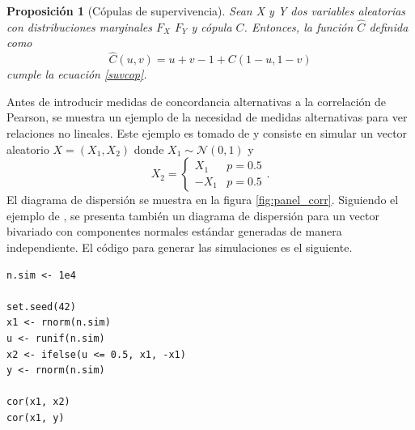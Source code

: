 \documentclass[11pt,a4paper]{article}
\newtheorem{proposition}{Proposición}[subsection]
\begin{document}
\begin{proposition}[Cópulas de supervivencia]
\label{def_cop_surv}
Sean X y Y dos variables aleatorias con distribuciones marginales $F_X$ $F_Y$ y cópula $C$. Entonces, la función $\widehat{C}$ definida como $$\widehat{C}(u, v) = u + v - 1 + C(1-u, 1-v)$$ cumple la ecuación \eqref{suvcop}.\\
\end{proposition}

Antes de introducir medidas de concordancia alternativas a la correlación de Pearson, se muestra un ejemplo de la necesidad de medidas alternativas para ver relaciones no lineales. Este ejemplo es tomado de \citet{copula_modeling} y consiste en simular un vector aleatorio $X = (X_1, X_2)$ donde $X_1 \sim \mathcal{N}(0, 1)$ y $$X_2 = \begin{cases}
X_1 & p = 0.5\\
-X_1 & p = 0.5
\end{cases}.$$ El diagrama de dispersión se muestra en la figura \ref{fig:panel_corr}. Siguiendo el ejemplo de \citet{copula_modeling}, se presenta también un diagrama de dispersión para un vector bivariado con componentes normales estándar generadas de manera independiente. El código para generar las simulaciones es el siguiente.\\

\begin{lstlisting}
n.sim <- 1e4

set.seed(42)
x1 <- rnorm(n.sim)
u <- runif(n.sim)
x2 <- ifelse(u <= 0.5, x1, -x1)
y <- rnorm(n.sim)

cor(x1, x2)
cor(x1, y)
\end{lstlisting}
\end{document}
